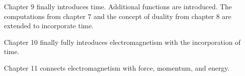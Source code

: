 \documentclass{book}
\begin{document}
Chapter 9 finally introduces time. Additional functions are introduced. The computations from chapter 7 and the concept of duality from chapter 8 are extended to incorporate time.

Chapter 10 finally fully introduces electromagnetism with the incorporation of time.  

Chapter 11 connects electromagnetism with force, momentum, and energy. 


\tableofcontents




\mainmatter








































\end{document}
